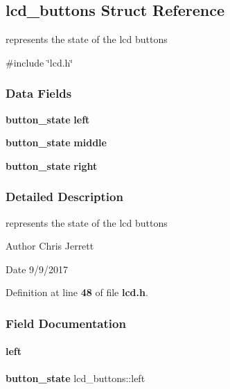 \subsection{lcd\+\_\+buttons Struct Reference}
\label{structlcd__buttons}


represents the state of the lcd buttons  




{\ttfamily \#include \char`\"{}lcd.\+h\char`\"{}}

\subsubsection*{Data Fields}
\begin{DoxyCompactItemize}
\item 
\textbf{ button\+\_\+state} \textbf{ left}
\item 
\textbf{ button\+\_\+state} \textbf{ middle}
\item 
\textbf{ button\+\_\+state} \textbf{ right}
\end{DoxyCompactItemize}


\subsubsection{Detailed Description}
represents the state of the lcd buttons 

\begin{DoxyAuthor}{Author}
Chris Jerrett 
\end{DoxyAuthor}
\begin{DoxyDate}{Date}
9/9/2017 
\end{DoxyDate}


Definition at line \textbf{ 48} of file \textbf{ lcd.\+h}.



\subsubsection{Field Documentation}
\mbox{\label{structlcd__buttons_ae385efb5ec794acf5f11027f46c6c039}} 
\paragraph{left}
{\footnotesize\ttfamily \textbf{ button\+\_\+state} lcd\+\_\+buttons\+::left}



